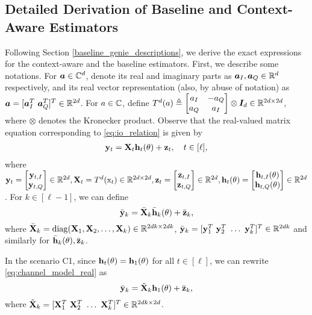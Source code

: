 \documentclass[journal,letterpaper,onecolumn]{IEEEtran}
\begin{document}




\appendix


\subsection{Detailed Derivation of Baseline and Context-Aware Estimators}
\label{baseline_genie}

Following Section \ref{baseline_genie_descriptions}, we derive the exact expressions for the context-aware and the baseline estimators. First, we describe some notations. For ${\bm{a}}\in{\mathbb{C}}^d$, denote its real and imaginary parts as ${\bm{a}}_I, {\bm{a}}_Q \in {\mathbb{R}}^d$ respectively, and its real vector representation (also, by abuse of notation) as ${\bm{a}} = [{\bm{a}}_I^T~{\bm{a}}_Q^T]^T\in\mathbb{R}^{2d}$. For $a\in{\mathbb{C}}$, define $T^d(a) \triangleq \begin{bmatrix}
    a_{I} & -a_Q \\ a_Q & a_I
\end{bmatrix} \otimes {\bm{I}}_d \in \mathbb{R}^{2d\times 2d}$, where $\otimes$ denotes the Kronecker product. Observe that the real-valued matrix equation corresponding to \ref{eq:io_relation} is given by
\begin{align*}
    {\mathbf{y}}_t = {\mathbf{X}}_t{\mathbf{h}}_t(\theta) + {\mathbf{z}}_t, \quad t\in[\ell],
\end{align*}
where ${\mathbf{y}}_t = \begin{bmatrix}{\mathbf{y}}_{t, I} \\ {\mathbf{y}}_{t, Q} \end{bmatrix} \in \mathbb{R}^{2d}, {\mathbf{X}}_t = T^d({\textnormal{x}}_t) \in \mathbb{R}^{2d \times 2d}, {\mathbf{z}}_t = \begin{bmatrix}{\mathbf{z}}_{t, I} \\ {\mathbf{z}}_{t, Q} \end{bmatrix} \in \mathbb{R}^{2d}, {\mathbf{h}}_t(\theta) = \begin{bmatrix}{\mathbf{h}}_{t, I}(\theta) \\ {\mathbf{h}}_{t, Q}(\theta) \end{bmatrix} \in\mathbb{R}^{2d}$. For $k\in[\ell-1]$, we can define
\begin{equation}
\label{eq:channel_model_real}
    \bar{{\mathbf{y}}}_{k} = \bar{{\mathbf{X}}}_k \bar{{\mathbf{h}}}_k(\theta) + \bar{{\mathbf{z}}}_k, 
\end{equation}
where $\bar{{\mathbf{X}}}_k = {\rm diag}({\mathbf{X}}_1, {\mathbf{X}}_2, \dots, {\mathbf{X}}_k) \in \mathbb{R}^{2dk\times 2dk}$, $\bar{{\mathbf{y}}}_k = [{\mathbf{y}}_1^T~{\mathbf{y}}_2^T~\dots~{\mathbf{y}}_k^T]^T \in \mathbb{R}^{2dk}$ and similarly for $\bar{{\mathbf{h}}}_k(\theta), \bar{{\mathbf{z}}}_k$. 

In the scenario C1, since ${\mathbf{h}}_t(\theta) = {\mathbf{h}}_1(\theta)$ for all $t\in[\ell]$, we can rewrite \ref{eq:channel_model_real} as
\begin{equation}
\label{eq:c1_equation}
    \bar{{\mathbf{y}}}_k = \tilde{{\mathbf{X}}}_k {\mathbf{h}}_1(\theta) + \bar{{\mathbf{z}}}_k, 
\end{equation}
where $\tilde{{\mathbf{X}}}_k = [{\mathbf{X}}_1^T ~{\mathbf{X}}_2^T ~\dots ~ {\mathbf{X}}_k^T ]^T \in{\mathbb{R}}^{2dk\times 2d}$. 
\end{document}
